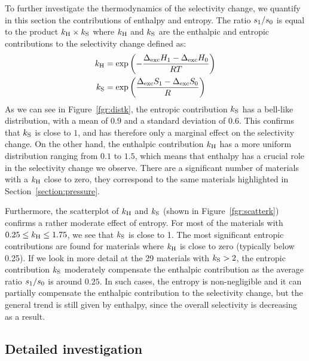 \documentclass[main.tex]{subfiles}
\begin{document}
To further investigate the thermodynamics of the selectivity change, we quantify in this section the contributions of enthalpy and entropy. The ratio ${s_{\text{1}}}/{s_{\text{0}}}$ is equal to the product $k_{\text{H}} \times k_{\text{S}}$ where $k_{\text{H}}$ and $k_{\text{S}}$ are the enthalpic and entropic contributions to the selectivity change defined as:
\begin{equation}
\label{eqn:effects}
    \begin{split}
      k_{\text{H}} & = \exp\left(-\dfrac{\Delta_{\text{exc}}H_{\text{1}}-\Delta_{\text{exc}}H_{\text{0}}}{RT}\right) \\ k_{\text{S}} & = \exp\left(\dfrac{\Delta_{\text{exc}}S_{\text{1}}-\Delta_{\text{exc}}S_{\text{0}}}{R}\right)
    \end{split}
\end{equation}
As we can see in Figure~\ref{fgr:distk}, the entropic contribution $k_{\text{S}}$ has a bell-like distribution, with a mean of $0.9$ and a standard deviation of $0.6$. This confirms that $k_{\text{S}}$ is close to $1$, and has therefore only a marginal effect on the selectivity change. On the other hand, the enthalpic contribution $k_{\text{H}}$ has a more uniform distribution ranging from $0.1$ to $1.5$, which means that enthalpy has a crucial role in the selectivity change we observe. There are a significant number of materials with a $k_{\text{H}}$ close to zero, they correspond to the same materials highlighted in Section~\ref{section:pressure}.

Furthermore, the scatterplot of $k_{\text{H}}$ and $k_{\text{S}}$ (shown in Figure~\ref{fgr:scatterk}) confirms a rather moderate effect of entropy. For most of the materials with $0.25 \le k_{\text{H}} \le 1.75$, we see that $k_{\text{S}}$ is close to 1. The most significant entropic contributions are found for materials where $k_{\text{H}}$ is close to zero (typically below 0.25). If we look in more detail at the 29 materials with $k_{\text{S}}>2$, the entropic contribution $k_{\text{S}}$ moderately compensate the enthalpic contribution as the average ratio $s_{\text{1}}/s_{\text{0}}$ is around $0.25$. In such cases, the entropy is non-negligible and it can partially compensate the enthalpic contribution to the selectivity change, but the general trend is still given by enthalpy, since the overall selectivity is decreasing as a result.
  
\subsection{Detailed investigation}
\label{sec:archetypes}
\end{document}
